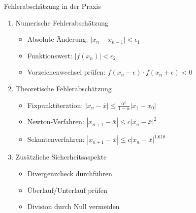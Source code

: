 \begin{KR}{Fehlerabschätzung in der Praxis}
\begin{enumerate}
    \item Numerische Fehlerabschätzung
    \begin{itemize}
        \item Absolute Änderung: $|x_n - x_{n-1}| < \epsilon_1$
        \item Funktionswert: $|f(x_n)| < \epsilon_2$
        \item Vorzeichenwechsel prüfen: $f(x_n-\epsilon) \cdot f(x_n+\epsilon) < 0$
    \end{itemize}
    
    \item Theoretische Fehlerabschätzung
    \begin{itemize}
        \item Fixpunktiteration: $|x_n-\bar{x}| \leq \frac{\alpha^n}{1-\alpha}|x_1-x_0|$
        \item Newton-Verfahren: $|x_{n+1}-\bar{x}| \leq c|x_n-\bar{x}|^2$
        \item Sekantenverfahren: $|x_{n+1}-\bar{x}| \leq c|x_n-\bar{x}|^{1.618}$
    \end{itemize}
    
    \item Zusätzliche Sicherheitsaspekte
    \begin{itemize}
        \item Divergenzcheck durchführen
        \item Überlauf/Unterlauf prüfen
        \item Division durch Null vermeiden
    \end{itemize}
\end{enumerate}
\end{KR}

